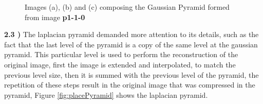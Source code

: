 \documentclass[12pt,a4paper]{article}
\begin{document}
\begin{figure}[!h]
	\centering
	\quad
	\quad
	\caption{Images (a), (b) and (c) composing the Gaussian Pyramid formed from image \textbf{p1-1-0}}
	\label{fig:gaussianPyramid}
\end{figure}

\textbf{2.3 )} The laplacian pyramid demanded more attention to its details, such as the fact that the last level of the pyramid is a copy of the same level at the gaussian pyramid. This particular level is used to perform the reconstruction of the original image, first the image is extended and interpolated, to match the previous level size, then it is summed with the previous level of the pyramid, the repetition of these steps result in the original image that was compressed in the pyramid, Figure \ref{fig:placePyramid} shows the laplacian pyramid. \\
\end{document}
